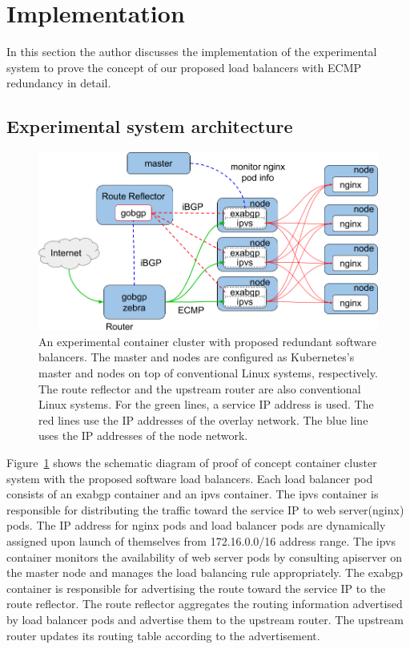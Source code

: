 \section{Implementation}

In this section the author discusses the implementation of the experimental system to prove the concept of our proposed load balancers with ECMP redundancy in detail.

\subsection{Experimental system architecture}\label{sec:poc}

\begin{figure}[tb]
\centering
\includegraphics[width=0.8\columnwidth]{Figs/poc.png}

\par\bigskip
\centering
\begin{minipage}{0.9\columnwidth}
  \caption[An experimental container cluster with proposed redundant software balancers]{
    An experimental container cluster with proposed redundant software balancers.
    The master and nodes are configured as Kubernetes's master and nodes on top of conventional Linux systems, respectively.
    The route reflector and the upstream router are also conventional Linux systems.
    For the green lines, a service IP address is used. The red lines use the IP addresses of the overlay network. The blue line uses the IP addresses of the node network.
  }
  \label{fig:poc}
\end{minipage}

\end{figure}

Figure~\ref{fig:poc} shows the schematic diagram of proof of concept container cluster system with the proposed software load balancers.
%
Each load balancer pod consists of an exabgp container and an ipvs container.
The ipvs container is responsible for distributing the traffic toward the service IP to web server(nginx) pods.
The IP address for nginx pods and load balancer pods are dynamically assigned upon launch of themselves from 172.16.0.0/16 address range.
The ipvs container monitors the availability of web server pods by consulting apiserver on the master node and manages the load balancing rule appropriately.
The exabgp container is responsible for advertising the route toward the service IP to the route reflector.
The route reflector aggregates the routing information advertised by load balancer pods and advertise them to the upstream router.
The upstream router updates its routing table according to the advertisement.

